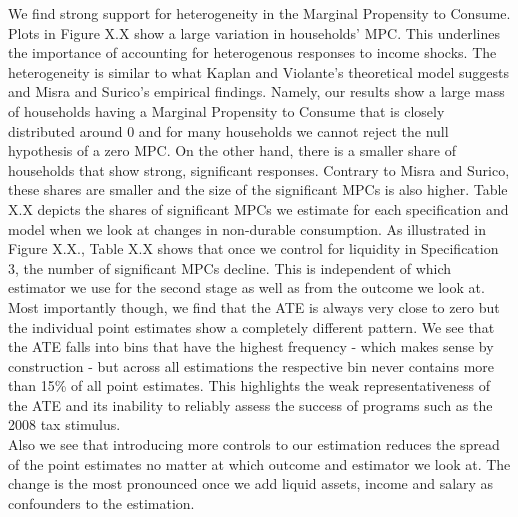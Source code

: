 We find strong support for heterogeneity in the Marginal Propensity to Consume. Plots in Figure X.X show a large variation in households' MPC. This underlines the importance of accounting for heterogenous responses to income shocks. The heterogeneity is similar to what Kaplan and Violante's theoretical model suggests and Misra and Surico's empirical findings. Namely, our results show a large mass of households having a Marginal Propensity to Consume that is closely distributed around 0 and for many households we cannot reject the null hypothesis of a zero MPC. On the other hand, there is a smaller share of households that show strong, significant responses. Contrary to Misra and Surico, these shares are smaller and the size of the significant MPCs is also higher. Table X.X depicts the shares of significant MPCs we estimate for each specification and model when we look at changes in non-durable consumption. As illustrated in Figure X.X., Table X.X shows that once we control for liquidity in Specification 3, the number of significant MPCs decline. This is independent of which estimator we use for the second stage as well as from the outcome we look at. \\
Most importantly though, we find that the ATE is always very close to zero but the individual point estimates show a completely different pattern. We see that the ATE falls into bins that have the highest frequency - which makes sense by construction - but across all estimations the respective bin never contains more than 15\% of all point estimates. This highlights the weak representativeness of the ATE and its inability to reliably assess the success of programs such as the 2008 tax stimulus. \\
Also we see that introducing more controls to our estimation reduces the spread of the point estimates no matter at which outcome and estimator we look at. The change is the most pronounced once we add liquid assets, income and salary as confounders to the estimation. \\
